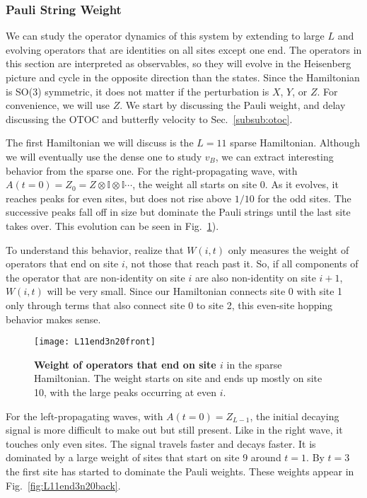 \subsubsection{Pauli String Weight} \label{subsub:pauli}  

We can study the operator dynamics of this system by extending to large $L$ and evolving operators that are identities on all sites except one end. The operators in this section are interpreted as observables, so they will evolve in the Heisenberg picture and cycle in the opposite direction than the states. Since the Hamiltonian is SO(3) symmetric, it does not matter if the perturbation is $X$, $Y$, or $Z$. For convenience, we will use $Z$. We start by discussing the Pauli weight, and delay discussing the OTOC and butterfly velocity to Sec.~\ref{subsub:otoc}.

The first Hamiltonian we will discuss is the $L=11$ sparse Hamiltonian. Although we will eventually use the dense one to study $v_B$, we can extract interesting behavior from the sparse one.
For the right-propagating wave, with $A(t=0) = Z_0 = Z\otimes \mathbb{I} \otimes \mathbb{I} \cdots$, the weight all starts on site 0. As it evolves, it reaches peaks for even sites, but does not rise above $1/10$ for the odd sites. The successive peaks fall off in size but dominate the Pauli strings until the last site takes over. This evolution can be seen in Fig.~\ref{fig:L11end3n20front}). 

To understand this behavior, realize that $W(i,t)$ only measures the weight of operators that end on site $i$, not those that reach past it. So, if all components of the operator that are non-identity on site $i$ are also non-identity on site $i+1$, $W(i,t)$ will be very small. Since our Hamiltonian connects site 0 with site 1 only through terms that also connect site 0 to site 2, this even-site hopping behavior makes sense. 

\begin{figure}
	\centering
	\texttt{[image: L11end3n20front]}
	\caption{\textbf{Weight of operators that end on site $i$} in the sparse Hamiltonian. The weight starts on site and ends up mostly on site 10, with the large peaks occurring at even $i$.}
	\label{fig:L11end3n20front}
\end{figure}

For the left-propagating waves, with $A(t=0)=Z_{L-1}$, the initial decaying signal is more difficult to make out but still present. Like in the right wave, it touches only even sites. The signal travels faster and decays faster. It is dominated by a large weight of sites that start on site 9 around $t=1$. By $t = 3$ the first site has started to dominate the Pauli weights. These weights appear in Fig.~\ref{fig:L11end3n20back}.


